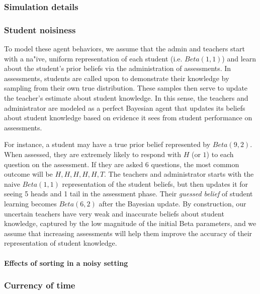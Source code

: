 \documentclass[10pt, letterpaper]{article}
\begin{document}
\subsubsection{Simulation details}\label{simulation-details-1}

\subsubsection{Student noisiness}\label{student-noisiness}

To model these agent behaviors, we assume that the admin and teachers
start with a na"ive, uniform representation of each student (i.e.
\(Beta(1,1)\)) and learn about the student's prior beliefs via the
administration of assessments. In assessments, students are called upon
to demonstrate their knowledge by sampling from their own true
distribution. These samples then serve to update the teacher's estimate
about student knowledge. In this sense, the teachers and administrator
are modeled as a perfect Bayesian agent that updates its beliefs about
student knowledge based on evidence it sees from student performance on
assessments.

For instance, a student may have a true prior belief represented by
\(Beta(9,2)\). When assessed, they are extremely likely to respond with
\(H\) (or \(1\)) to each question on the assessment. If they are asked 6
questions, the most common outcome will be \({H, H, H, H, H, T}\). The
teachers and administrator starts with the naive \(Beta(1,1)\)
representation of the student beliefs, but then updates it for seeing 5
heads and 1 tail in the assessment phase. Their \emph{guessed belief} of
student learning becomes \(Beta(6,2)\) after the Bayesian update. By
construction, our uncertain teachers have very weak and inaccurate
beliefs about student knowledge, captured by the low magnitude of the
initial Beta parameters, and we assume that increasing assessments will
help them improve the accuracy of their representation of student
knowledge.

\paragraph{Effects of sorting in a noisy
setting}\label{effects-of-sorting-in-a-noisy-setting}

\subsubsection{Currency of time}\label{currency-of-time}
\end{document}
